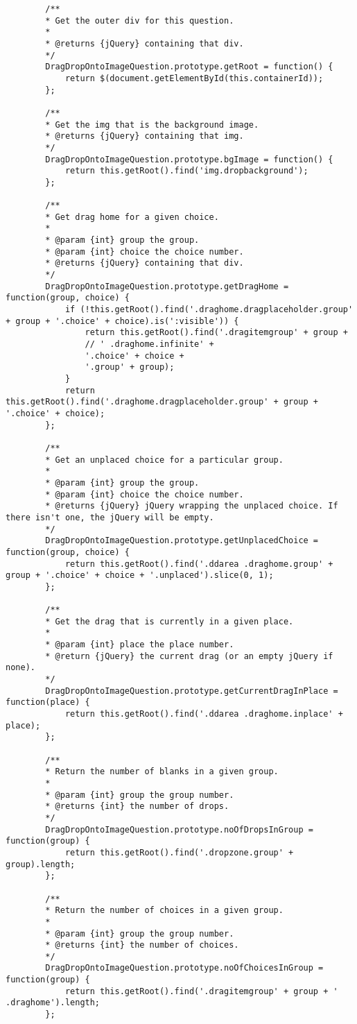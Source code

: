\begin{lstlisting}
		/**
		* Get the outer div for this question.
		*
		* @returns {jQuery} containing that div.
		*/
		DragDropOntoImageQuestion.prototype.getRoot = function() {
			return $(document.getElementById(this.containerId));
		};
		
		/**
		* Get the img that is the background image.
		* @returns {jQuery} containing that img.
		*/
		DragDropOntoImageQuestion.prototype.bgImage = function() {
			return this.getRoot().find('img.dropbackground');
		};
		
		/**
		* Get drag home for a given choice.
		*
		* @param {int} group the group.
		* @param {int} choice the choice number.
		* @returns {jQuery} containing that div.
		*/
		DragDropOntoImageQuestion.prototype.getDragHome = function(group, choice) {
			if (!this.getRoot().find('.draghome.dragplaceholder.group' + group + '.choice' + choice).is(':visible')) {
				return this.getRoot().find('.dragitemgroup' + group +
				// ' .draghome.infinite' +
				'.choice' + choice +
				'.group' + group);
			}
			return this.getRoot().find('.draghome.dragplaceholder.group' + group + '.choice' + choice);
		};
		
		/**
		* Get an unplaced choice for a particular group.
		*
		* @param {int} group the group.
		* @param {int} choice the choice number.
		* @returns {jQuery} jQuery wrapping the unplaced choice. If there isn't one, the jQuery will be empty.
		*/
		DragDropOntoImageQuestion.prototype.getUnplacedChoice = function(group, choice) {
			return this.getRoot().find('.ddarea .draghome.group' + group + '.choice' + choice + '.unplaced').slice(0, 1);
		};
		
		/**
		* Get the drag that is currently in a given place.
		*
		* @param {int} place the place number.
		* @return {jQuery} the current drag (or an empty jQuery if none).
		*/
		DragDropOntoImageQuestion.prototype.getCurrentDragInPlace = function(place) {
			return this.getRoot().find('.ddarea .draghome.inplace' + place);
		};
		
		/**
		* Return the number of blanks in a given group.
		*
		* @param {int} group the group number.
		* @returns {int} the number of drops.
		*/
		DragDropOntoImageQuestion.prototype.noOfDropsInGroup = function(group) {
			return this.getRoot().find('.dropzone.group' + group).length;
		};
		
		/**
		* Return the number of choices in a given group.
		*
		* @param {int} group the group number.
		* @returns {int} the number of choices.
		*/
		DragDropOntoImageQuestion.prototype.noOfChoicesInGroup = function(group) {
			return this.getRoot().find('.dragitemgroup' + group + ' .draghome').length;
		};
		

\end{lstlisting}

